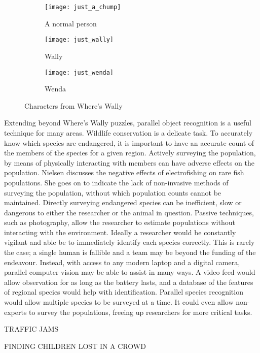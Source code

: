 \documentclass[../main.tex]{subfiles}
\begin{document}
    \begin{figure}[H]
    \centering
      \begin{subfigure}[b]{0.3\textwidth}
        \centering
        \texttt{[image: just\_a\_chump]}   
        \caption{A normal person}
        \label{justachump}
      \end{subfigure}
      \begin{subfigure}[b]{0.3\textwidth}
        \centering
        \texttt{[image: just\_wally]}   
        \caption{Wally}
        \label{justwally}
      \end{subfigure}
      \begin{subfigure}[b]{0.3\textwidth}
        \centering
        \texttt{[image: just\_wenda]}   
        \caption{Wenda}
        \label{justwenda}
      \end{subfigure}
    \caption{Characters from Where's Wally}
    \label{wallychars}
    \end{figure}

    Extending beyond Where's Wally puzzles, parallel object recognition is a useful technique for many areas.
    Wildlife conservation is a delicate task.
    To accurately know which species are endangered, it is important to have an accurate count of the members of the species for a given region.
    Actively surveying the population, by means of physically interacting with members can have adverse effects on the population.
    Nielsen \cite{electrofishing} discusses the negative effects of electrofishing on rare fish populations.
    She goes on to indicate the lack of non-invasive methods of surveying the population, without which population counts cannot be maintained.
    Directly surveying endangered species can be inefficient, slow or dangerous to either the researcher or the animal in question.
    Passive techniques, such as photography, allow the researcher to estimate populations without interacting with the environment.
    Ideally a researcher would be constantly vigilant and able be to immediately identify each species correctly.
    This is rarely the case; a single human is fallible and a team may be beyond the funding of the endeavour.
    Instead, with access to any modern laptop and a digital camera, parallel computer vision may be able to assist in many ways.
    A video feed would allow observation for as long as the battery lasts, and a database of the features of regional species would help with identification.
    Parallel species recognition would allow multiple species to be surveyed at a time.
    It could even allow non-experts to survey the populations, freeing up researchers for more critical tasks.
      
    TRAFFIC JAMS
    
    FINDING CHILDREN LOST IN A CROWD
\end{document}

